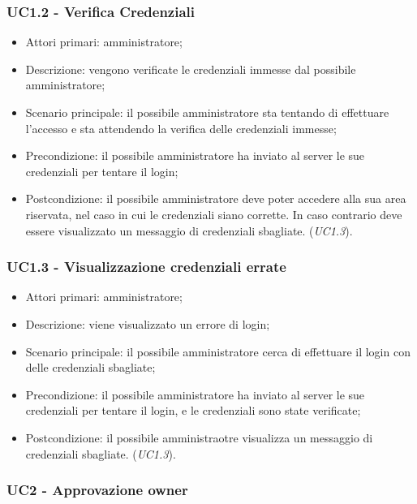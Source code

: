\subsubsection{UC1.2 - Verifica Credenziali}

\begin{itemize}
\item Attori primari: amministratore;
\item Descrizione: vengono verificate le credenziali immesse dal possibile amministratore;
\item Scenario principale: il possibile amministratore sta tentando di effettuare l'accesso e sta attendendo la verifica delle credenziali immesse;
\item Precondizione: il possibile amministratore ha inviato al server le sue credenziali per tentare il login;
\item Postcondizione: il possibile amministratore deve poter accedere alla sua area riservata, nel caso in cui le credenziali siano corrette. In caso
contrario deve essere visualizzato un messaggio di credenziali sbagliate. (\emph{UC1.3}).

\end{itemize}


\subsubsection{UC1.3 - Visualizzazione credenziali errate}

\begin{itemize}
\item Attori primari: amministratore;
\item Descrizione: viene visualizzato un errore di login;
\item Scenario principale: il possibile amministratore cerca di effettuare il login con delle credenziali sbagliate;
\item Precondizione: il possibile amministratore ha inviato al server le sue credenziali per tentare il login, e le credenziali sono state verificate;
\item Postcondizione: il possibile amministraotre visualizza un messaggio di credenziali sbagliate. (\emph{UC1.3}).

\end{itemize}

\subsubsection{UC2 - Approvazione owner}

